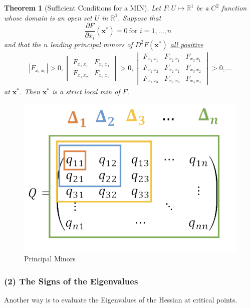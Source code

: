 \documentclass[11pt,a4paper]{book}
\newtheorem{theorem}{Theorem}[section]
\theoremstyle{definition}\newtheorem{definition}{Definition}
\theoremstyle{definition}\newtheorem{fact}{Fact}
\theoremstyle{definition}\newtheorem{remark}{Remark}
\theoremstyle{definition}\newtheorem{ex}{Ex.}
\theoremstyle{definition}\newtheorem{project}{Project}
\theoremstyle{definition}\newtheorem{problem}{Problem}
\theoremstyle{definition}\newtheorem{example}{Example}
\newenvironment{ftheorem}
{\begin{mdframed}\begin{theorem}}
		{\end{theorem}\end{mdframed}}
\numberwithin{theorem}{section}
\numberwithin{corollary}{chapter}
\numberwithin{assumption}{chapter}
\numberwithin{definition}{chapter}
\numberwithin{prop}{chapter}
\numberwithin{notation}{chapter}
\numberwithin{problem}{chapter}
\numberwithin{example}{chapter}
\numberwithin{fact}{chapter}
\numberwithin{ex}{chapter}
\def\R{\mathbb R}
\def\R{\mathbb R}
\def\x{\mathbf x}
\begin{document}
	\begin{ftheorem}[Sufficient Conditions for a MIN]
		Let $F: U \mapsto \R^1$ be a $C^2$ function whose domain is an open set $U$ in $\R^1$. Suppose that
		\begin{equation*}
			\frac{\partial F}{\partial x_i} (\x^*) = 0 \ \text{for $i = 1, \dots, n$ }
		\end{equation*}
		and that the $n$ leading principal minors of $D^2 F(\x^*)$ \underline{all positive}
		\begin{align*}
			|F_{x_1 \ x_1}| > 0, 
			\begin{vmatrix}
				F_{x_1 \ x_1} & F_{x_2 \ x_1} \\
				F_{x_1 \ x_2} & F_{x_2 \ x_2} 
			\end{vmatrix} > 0,
			\begin{vmatrix}
				F_{x_1 \ x_1} & F_{x_2 \ x_1} & F_{x_3 \ x_1} \\
				F_{x_1 \ x_2} & F_{x_2 \ x_2} & F_{x_3 \ x_2} \\
				F_{x_1 \ x_3} & F_{x_2 \ x_3} & F_{x_3 \ x_3} 
			\end{vmatrix} > 0, \dots
		\end{align*}
		at $\x^*$. Then $\x^*$ is a strict local min of $F$.
	\end{ftheorem}
	
	\begin{figure}[ht]
		\centering
		\includegraphics[scale=0.4]{figs/prinminors.png}
		\caption{Principal Minors}
	\end{figure}
	
	\subsubsection{(2) The Signs of the Eigenvalues}
	Another way is to evaluate the Eigenvalues of the Hessian at critical points. 
	
\end{document}
